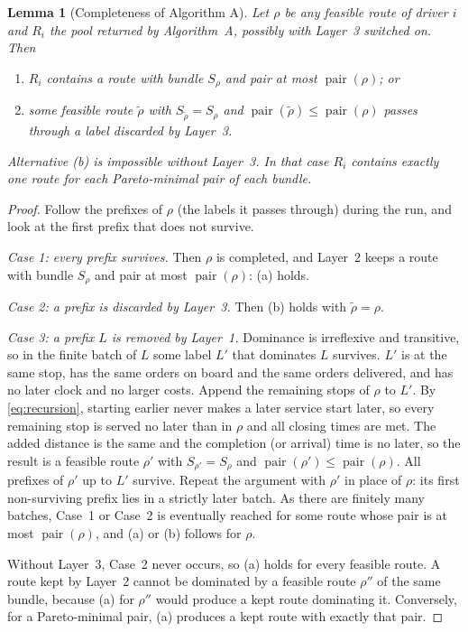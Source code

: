 \documentclass[11pt]{article}
\newtheorem{plemma}{Lemma}
\theoremstyle{definition}
\theoremstyle{remark}
\newcommand{\pair}{\operatorname{pair}}
\begin{document}
\begin{plemma}[Completeness of Algorithm A]\label{lem:complete}
Let $\rho$ be any feasible route of driver $i$ and $R_i$ the pool returned by
Algorithm~A, possibly with Layer~3 switched on. Then
\begin{enumerate}[label=(\alph*), itemsep=1pt]
\item $R_i$ contains a route with bundle $S_\rho$ and pair at most $\pair(\rho)$; or
\item some feasible route $\tilde\rho$ with $S_{\tilde\rho}=S_\rho$ and
$\pair(\tilde\rho)\le\pair(\rho)$ passes through a label discarded by Layer~3.
\end{enumerate}
Alternative (b) is impossible without Layer~3. In that case $R_i$ contains
exactly one route for each Pareto-minimal pair of each bundle.
\end{plemma}

\begin{proof}
Follow the prefixes of $\rho$ (the labels it passes through) during the run,
and look at the first prefix that does not survive.

\emph{Case 1: every prefix survives.} Then $\rho$ is completed, and Layer~2
keeps a route with bundle $S_\rho$ and pair at most $\pair(\rho)$: (a) holds.

\emph{Case 2: a prefix is discarded by Layer~3.} Then (b) holds with
$\tilde\rho=\rho$.

\emph{Case 3: a prefix $L$ is removed by Layer~1.} Dominance is irreflexive and
transitive, so in the finite batch of $L$ some label $L'$ that dominates $L$
survives. $L'$ is at the same stop, has the same orders on board and the same
orders delivered, and has no later clock and no larger costs. Append the
remaining stops of $\rho$ to $L'$. By \eqref{eq:recursion}, starting earlier
never makes a later service start later, so every remaining stop is served no
later than in $\rho$ and all closing times are met. The added distance is the
same and the completion (or arrival) time is no later, so the result is a
feasible route $\rho'$ with $S_{\rho'}=S_\rho$ and $\pair(\rho')\le\pair(\rho)$. All prefixes of
$\rho'$ up to $L'$ survive. Repeat the argument with $\rho'$ in place of $\rho$:
its first non-surviving prefix lies in a strictly later batch. As there are
finitely many batches, Case~1 or Case~2 is eventually reached for some route
whose pair is at most $\pair(\rho)$, and (a) or (b) follows for $\rho$.

Without Layer~3, Case~2 never occurs, so (a) holds for every feasible route. A
route kept by Layer~2 cannot be dominated by a feasible route $\rho''$ of the
same bundle, because (a) for $\rho''$ would produce a kept route dominating it.
Conversely, for a Pareto-minimal pair, (a) produces a kept route with exactly
that pair.
\end{proof}
\end{document}
